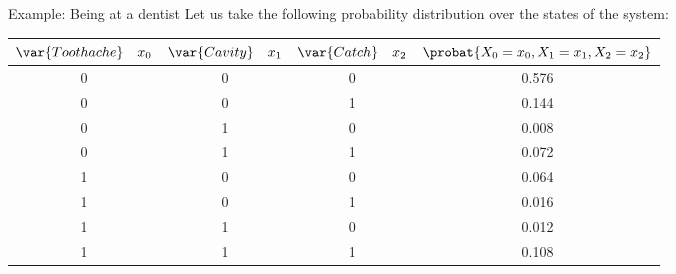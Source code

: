 \documentclass{beamer}
\begin{document}
    \begin{frame}{Example: Being at a dentist}
        Let us take the following probability distribution over the states of the system:
        \begin{tabular}{c|c|c|c}
            $\var{Toothache} \quad \catindexof{0}$ & $\var{Cavity} \quad \catindexof{1}$ & $\var{Catch} \quad \catindexof{2}$   & $\probat{\indexedcatvariableof{0},\indexedcatvariableof{1},\indexedcatvariableof{2}}$ \\ \hline
            0                                      & 0                                   & 0                                  & 0.576                                                                                 \\
            0                                      & 0                                   & 1                                  & 0.144                                                                                 \\
            0                                      & 1                                   & 0                                  & 0.008                                                                                 \\
            0                                      & 1                                   & 1                                  & 0.072                                                                                 \\
            1                                      & 0                                   & 0                                  & 0.064                                                                                 \\
            1                                      & 0                                   & 1                                  & 0.016                                                                                 \\
            1                                      & 1                                   & 0                                  & 0.012                                                                                 \\
            1                                      & 1                                   & 1                                  & 0.108                                                                                 \\
        \end{tabular}

\end{frame}
\end{document}
